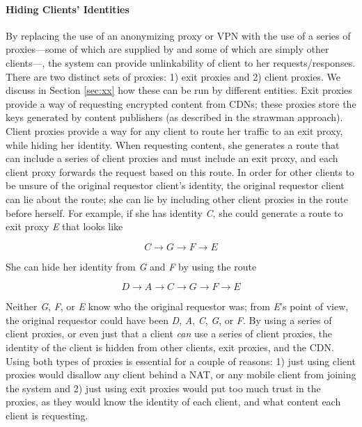 \paragraph{Hiding Clients' Identities} By replacing the use of an anonymizing proxy or VPN with the use of 
a series of proxies---some of which are supplied by \system{} and some of which are simply other clients---, 
the system can provide unlinkability of client to her requests/responses. There are two distinct sets of 
proxies: 1) exit proxies and 2) client proxies.  We discuss in Section \ref{sec:xx} how these can be run by different 
entities.  Exit proxies provide a way of requesting encrypted content from CDNs; these proxies store the keys generated 
by content publishers (as described in the strawman approach).  Client proxies provide 
a way for any client to route her traffic to an exit proxy, while hiding her identity.  When requesting content, she 
generates a route that can include a series of client proxies and must include an exit proxy, and each client proxy 
forwards the request based on this route.  In order for other clients to be unsure of the original requestor client's 
identity, the original requestor client can lie about the route; she can lie by including other client proxies 
in the route before herself.  For example, if she has identity {\it C}, she could generate a route to exit proxy {\it E} that 
looks like 

\[C \rightarrow G \rightarrow F \rightarrow E\] 

\noindent She can hide her identity from {\it G} and {\it F} by using the route 

\[D \rightarrow A \rightarrow C \rightarrow G \rightarrow F \rightarrow E\]  

\noindent Neither {\it G}, {\it F}, or {\it E} know who the original requestor was; from {\it E}'s point of 
view, the original requestor could have been {\it D}, {\it A}, {\it C}, {\it G}, or {\it F}.  By using a series of 
client proxies, or even just that a client {\it can} use a series of client proxies, the identity of the client is 
hidden from other clients, exit proxies, and the CDN.  Using both types of proxies is essential for a couple of 
reasons: 1) just using client proxies would disallow any client behind a NAT, or any mobile client from joining 
the system and 2) just using exit proxies would put too much trust in the proxies, as they would know the identity 
of each client, and what content each client is requesting.


